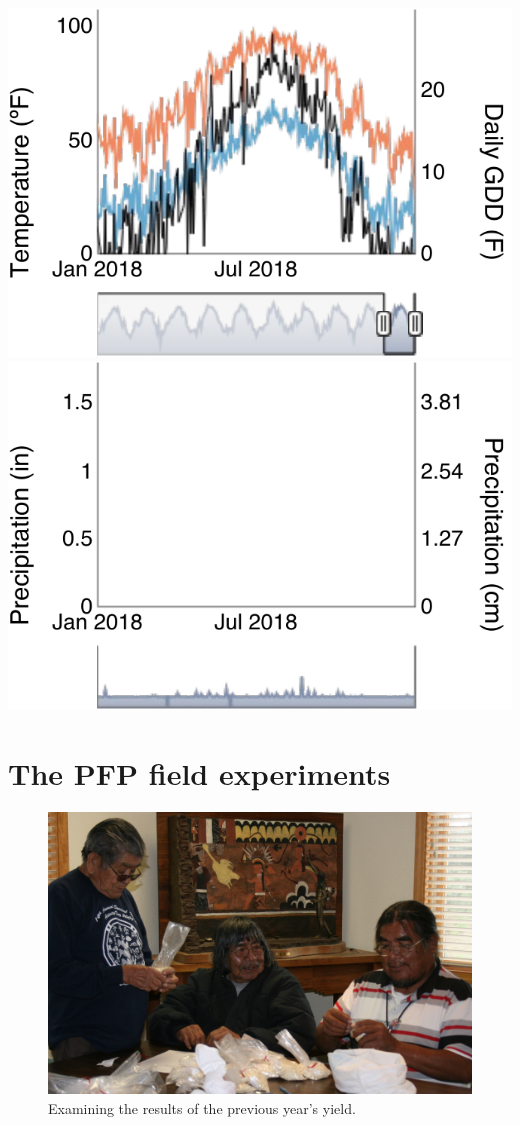 \documentclass[12pt,]{article}
\begin{document}
\includegraphics[width=1\linewidth]{images/unnamed-chunk-3-1}
\includegraphics[width=1\linewidth]{images/unnamed-chunk-3-2}

\hypertarget{the-pfp-field-experiments}{%
\section{The PFP field experiments}\label{the-pfp-field-experiments}}

\begin{figure}
\centering
\includegraphics{./images/chapter_5_header.jpg}
\caption{Examining the results of the previous year's yield.}
\end{figure}
\end{document}
